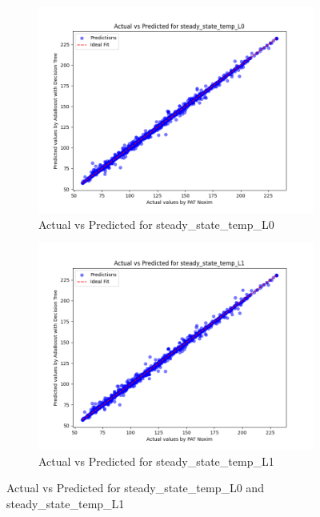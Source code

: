 \documentclass[conference]{IEEEtran}
\begin{document}
\begin{figure}[htbp]
    \begin{subfigure}{0.24\textwidth}
        \centering
        \includegraphics[width=\linewidth]{actual_vs_predicted_steady_state_temp_L0.png}
        \caption{Actual vs Predicted for steady\_state\_temp\_L0}
        \label{fig:actual_vs_predicted_steady_state_temp_L0}
    \end{subfigure}
    \hfill
    \begin{subfigure}{0.24\textwidth}
        \includegraphics[width=\linewidth]{actual_vs_predicted_steady_state_temp_L1.png}
        \caption{Actual vs Predicted for steady\_state\_temp\_L1}
        \label{fig:actual_vs_predicted_steady_state_temp_L1}
    \end{subfigure}

    \caption{Actual vs Predicted for steady\_state\_temp\_L0 and steady\_state\_temp\_L1}
    \label{fig:side_by_side_graphs_steady_state_temp}
\end{figure}
\end{document}
